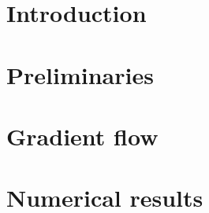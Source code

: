 \documentclass[oneside]{memoir}
\numberwithin{equation}{chapter}
\numberwithin{figure}{chapter}
\numberwithin{table}{chapter}
\begin{document}
\frontmatter



\tableofcontents

\newpage

\mainmatter

\chapter{Introduction}
\label{cha:introduction}



\chapter{Preliminaries}
\label{cha:preliminaries}





\chapter{Gradient flow}
\label{cha:gradient-flow}









\chapter{Numerical results}
\label{cha:numerical-results}



% 

\appendix




\end{document}
